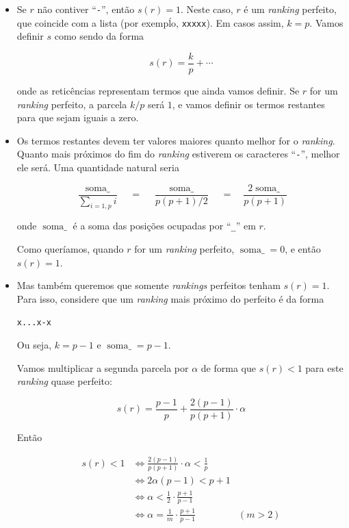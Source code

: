 \documentclass[
  letterpaper,
  DIV=11,
  numbers=noendperiod]{scrreprt}
\begin{document}
\begin{itemize}
\item
  Se $r$ não contiver ``\texttt{-}'', então $s(r) = 1$. Neste caso, $r$
  é um \emph{ranking} perfeito, que coincide com a lista (por exempĺo,
  \texttt{xxxxx}). Em casos assim, $k = p$. Vamos definir $s$ como sendo
  da forma

  \[
  s(r) = \frac k p + \cdots
  \]

  onde as reticências representam termos que ainda vamos definir. Se $r$
  for um \emph{ranking} perfeito, a parcela $k/p$ será $1$, e vamos
  definir os termos restantes para que sejam iguais a zero.
\item
  Os termos restantes devem ter valores maiores quanto melhor for o
  \emph{ranking}. Quanto mais próximos do fim do \emph{ranking}
  estiverem os caracteres ``\texttt{-}'', melhor ele será. Uma
  quantidade natural seria

  \[
  \frac{\operatorname{soma\_}}{\sum_{i = 1, p}i} 
  \quad=\quad 
  \frac{\operatorname{soma\_}}{p(p + 1) / 2}
  \quad=\quad 
  \frac{2\operatorname{soma\_}}{p(p + 1)}
  \]

  onde $\operatorname{soma\_}$ é a soma das posições ocupadas por
  ``\texttt{\_}'' em $r$.

  Como queríamos, quando $r$ for um \emph{ranking} perfeito,
  $\operatorname{soma\_} = 0$, e então $s(r) = 1$.
\item
  Mas também queremos que somente \emph{rankings} perfeitos tenham
  $s(r) = 1$. Para isso, considere que um \emph{ranking} mais próximo do
  perfeito é da forma

  \texttt{x...x-x}

  Ou seja, $k = p - 1$ e $\operatorname{soma\_} = p - 1$.

  Vamos multiplicar a segunda parcela por $\alpha$ de forma que
  $s(r) < 1$ para este \emph{ranking} quase perfeito:

  \[
  s(r) = \frac{p-1}{p} + \frac{2(p-1)}{p(p+1)} \cdot \alpha
  \]

  Então

  \[
  \begin{aligned}
    s(r) < 1 
    &\iff \frac{2(p-1)}{p(p+1)} \cdot \alpha < \frac1p \\
    &\iff 2 \alpha (p - 1) < p + 1 \\
    &\iff \alpha < \frac12 \cdot \frac{p + 1}{p - 1} \\
    &\iff \alpha = \frac1m \cdot \frac{p + 1}{p - 1} & (m > 2)
  \end{aligned}
  \]


\end{itemize}
\end{document}
